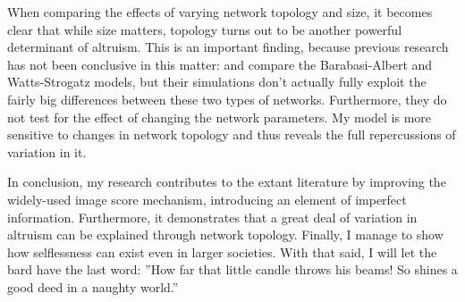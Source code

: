 \documentclass[12pt]{article}
\begin{document}
When comparing the effects of varying network topology and size, it becomes clear that while size matters, topology turns out to be another powerful determinant of altruism. This is an important finding, because previous research has not been conclusive in this matter: \cite{Santos2008} and \cite{Peleteiro2014} compare the Barabasi-Albert and Watts-Strogatz models, but their simulations don't actually fully exploit the fairly big differences between these two types of networks. Furthermore, they do not test for the effect of changing the network parameters. My model is more sensitive to changes in network topology and thus reveals the full repercussions of variation in it.







In conclusion, my research contributes to the extant literature by improving the widely-used image score mechanism, introducing an element of imperfect information. Furthermore, it demonstrates that a great deal of variation in altruism can be explained through network topology. Finally, I manage to show how selflessness can exist even in larger societies. With that said, I will let the bard \citep{Shakespeare} have the last word: ''How far that little candle throws his beams! So shines a good deed in a naughty world.''
\end{document}
